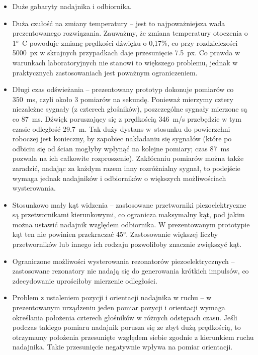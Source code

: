 \begin{itemize}
 \item Duże gabaryty nadajnika i odbiornika.
 
 \item Duża czułość na zmiany temperatury -- jest to najpoważniejsza wada prezentowanego rozwiązania.
 Zauważmy, że zmiana temperatury otoczenia o \ang{1}\SI{}{C} powoduje zmianę prędkości dźwięku o 0,17\%,
 co przy rozdzielczości \SI{5000}{px} w skrajnych przypadkach daje przesunięcie \SI{7.5}{px}.
 Co prawda w warunkach laboratoryjnych nie stanowi to większego problemu, jednak w praktycznych zastosowaniach
 jest poważnym ograniczeniem.
 
 \item Długi czas odświeżania -- prezentowany prototyp dokonuje pomiarów co \SI{350}{ms}, czyli około 3 pomiarów 
 na sekundę. Ponieważ mierzymy cztery niezależne sygnały (z czterech głośników), poszczególne sygnały mierzone są co \SI{87}{ms}.
  Dźwięk poruszający się z prędkością \SI{346}{m/s}  przebędzie  w tym czasie odległość \SI{29.7}{m}.
 Tak duży dystans w~stosunku do powierzchni roboczej jest konieczny, by zapobiec nakładaniu się sygnałów
 (które po odbiciu się od ścian mogłyby wpłynąć na kolejne pomiary; czas \SI{87}{ms} pozwala 
 na ich całkowite rozproszenie).
 Zakłócaniu pomiarów można także zaradzić, nadając za każdym razem inny rozróżnialny sygnał, to podejście 
 wymaga jednak nadajników i odbiorników o większych możliwościach wysterowania.
 
 \item Stosunkowo mały kąt widzenia -- zastosowane przetworniki piezoelektryczne są przetwornikami kierunkowymi, co 
 ogranicza  maksymalny kąt, pod jakim można ustawić nadajnik względem odbiornika. W prezentowanym 
 prototypie kąt ten nie powinien przekraczać \ang{45}. Zastosowanie większej liczby przetworników lub innego ich rodzaju
 pozwoliłoby znacznie zwiększyć kąt.

 \item Ograniczone możliwości wysterowania rezonatorów piezoelektrycznych -- 
 zastosowane rezonatory nie nadają się do generowania krótkich impulsów, co zdecydowanie uprościłoby mierzenie odległości.
 
 \item Problem z ustaleniem pozycji i orientacji nadajnika w ruchu -- w prezentowanym urządzeniu 
 jeden pomiar pozycji i orientacji wymaga określania położenia czterech głośników w różnych odstępach czasu.
 Jeśli podczas takiego pomiaru nadajnik porusza się ze zbyt dużą prędkością, to otrzymamy położenia
 przesunięte względem siebie zgodnie z kierunkiem ruchu nadajnika. Takie przesunięcie negatywnie wpływa na 
 pomiar orientacji. 
\end{itemize}


